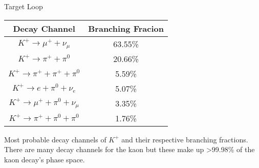 \begin{Mtable}{Target Loop}
  \centering
  \begin{tabular}{|c|c|}
    \hline
    \textbf{Decay Channel} & \textbf{Branching Fracion} \\
    \hline
    $K^+\rightarrow \mu^++\nu_{\mu}$ & 63.55\% \\
    $K^+\rightarrow \pi^++\pi^0$ & 20.66\% \\
    $K^+\rightarrow \pi^++\pi^++\pi^0$ & 5.59\% \\
    $K^+\rightarrow e+\pi^0+\nu_e$ & 5.07\% \\
    $K^+\rightarrow \mu^++\pi^0+\nu_{\mu}$ & 3.35\% \\
    $K^+\rightarrow \pi^++\pi^0+\pi^0$ & 1.76\% \\
    \hline
    \end{tabular}
  \caption{Most probable decay channels of $K^+$ and their respective branching fractions. There are many decay channels for the kaon but these make up >99.98\% of the kaon decay's phase space.}
  \label{tab:4-5_kaon_decay}
\end{Mtable}

